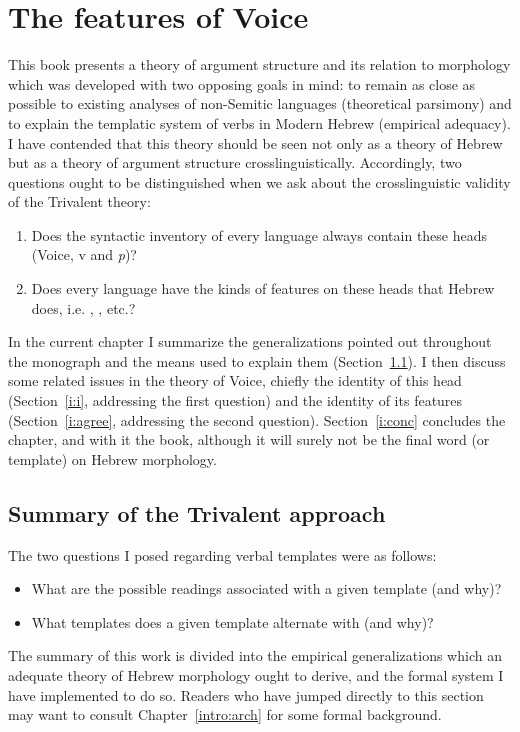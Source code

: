 \chapter{The features of Voice}
\label{chap:i}

This book presents a theory of argument structure and its relation to morphology which was developed with two opposing goals in mind: to remain as close as possible to existing analyses of non-Semitic languages (theoretical parsimony) and to explain the templatic system of verbs in Modern Hebrew (empirical adequacy). I have contended that this theory should be seen not only as a theory of Hebrew but as a theory of argument structure crosslinguistically. Accordingly, two questions ought to be distinguished when we ask about the crosslinguistic validity of the Trivalent theory:
\begin{enumerate}
	\item Does the syntactic inventory of every language always contain these heads (Voice, v and \emph{p})?
	\item Does every language have the kinds of features on these heads that Hebrew does, i.e. {\vd}, \pz, etc.?
\end{enumerate}

In the current chapter I summarize the generalizations pointed out throughout the monograph and the means used to explain them (Section~\ref{i:sum}). I then discuss some related issues in the theory of Voice, chiefly the identity of this head (Section~\ref{i:i}, addressing the first question) and the identity of its features (Section~\ref{i:agree}, addressing the second question). Section~\ref{i:conc} concludes the chapter, and with it the book, although it will surely not be the final word (or template) on Hebrew morphology.


\section{Summary of the Trivalent approach} \label{i:sum}
The two questions I posed regarding verbal templates were as follows:
\begin{itemize}
	\item What are the possible readings associated with a given template (and why)?
	\item What templates does a given template alternate with (and why)?
\end{itemize}

The summary of this work is divided into the empirical generalizations which an adequate theory of Hebrew morphology ought to derive, and the formal system I have implemented to do so. Readers who have jumped directly to this section may want to consult Chapter~\ref{intro:arch} for some formal background.

